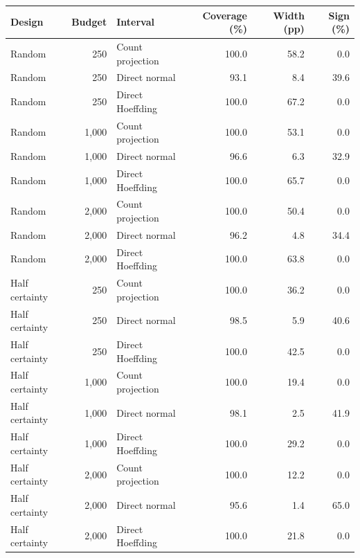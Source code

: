 \begin{tabular}{lr lrrr}
\toprule
Design & Budget & Interval & Coverage (\%) & Width (pp) & Sign (\%) \\
\midrule
Random & 250 & Count projection & 100.0 & 58.2 & 0.0 \\
Random & 250 & Direct normal & 93.1 & 8.4 & 39.6 \\
Random & 250 & Direct Hoeffding & 100.0 & 67.2 & 0.0 \\
Random & 1,000 & Count projection & 100.0 & 53.1 & 0.0 \\
Random & 1,000 & Direct normal & 96.6 & 6.3 & 32.9 \\
Random & 1,000 & Direct Hoeffding & 100.0 & 65.7 & 0.0 \\
Random & 2,000 & Count projection & 100.0 & 50.4 & 0.0 \\
Random & 2,000 & Direct normal & 96.2 & 4.8 & 34.4 \\
Random & 2,000 & Direct Hoeffding & 100.0 & 63.8 & 0.0 \\
Half certainty & 250 & Count projection & 100.0 & 36.2 & 0.0 \\
Half certainty & 250 & Direct normal & 98.5 & 5.9 & 40.6 \\
Half certainty & 250 & Direct Hoeffding & 100.0 & 42.5 & 0.0 \\
Half certainty & 1,000 & Count projection & 100.0 & 19.4 & 0.0 \\
Half certainty & 1,000 & Direct normal & 98.1 & 2.5 & 41.9 \\
Half certainty & 1,000 & Direct Hoeffding & 100.0 & 29.2 & 0.0 \\
Half certainty & 2,000 & Count projection & 100.0 & 12.2 & 0.0 \\
Half certainty & 2,000 & Direct normal & 95.6 & 1.4 & 65.0 \\
Half certainty & 2,000 & Direct Hoeffding & 100.0 & 21.8 & 0.0 \\
\bottomrule
\end{tabular}
